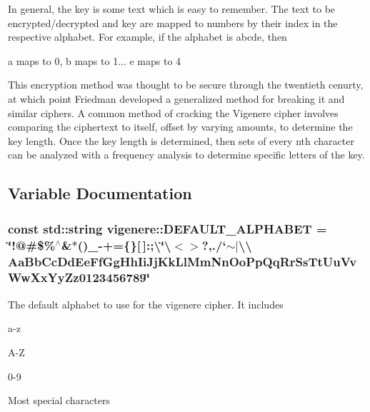 In general, the key is some text which is easy to remember. The text to be encrypted/decrypted and key are mapped to numbers by their index in the respective alphabet. For example, if the alphabet is \textquotesingle{}abcde\textquotesingle{}, then
\begin{DoxyItemize}
\item \textquotesingle{}a\textquotesingle{} maps to 0, \textquotesingle{}b\textquotesingle{} maps to 1... \textquotesingle{}e\textquotesingle{} maps to 4
\end{DoxyItemize}

This encryption method was thought to be secure through the twentieth cenurty, at which point Friedman developed a generalized method for breaking it and similar ciphers. A common method of cracking the Vigenere cipher involves comparing the ciphertext to itself, offset by varying amounts, to determine the key length. Once the key length is determined, then sets of every nth character can be analyzed with a frequency analysis to determine specific letters of the key. 

\subsection{Variable Documentation}
\subsubsection[{\texorpdfstring{D\+E\+F\+A\+U\+L\+T\+\_\+\+A\+L\+P\+H\+A\+B\+ET}{DEFAULT_ALPHABET}}]{\setlength{\rightskip}{0pt plus 5cm}const std\+::string vigenere\+::\+D\+E\+F\+A\+U\+L\+T\+\_\+\+A\+L\+P\+H\+A\+B\+ET = \char`\"{}!@\#\$\%$^\wedge$\&$\ast$()\+\_\+-\/+=\{\}\mbox{[}$\,$\mbox{]}\+:;\textbackslash{}\char`\"{}\textbackslash{}\textquotesingle{}$<$$>$?,./`$\sim$$\vert$\textbackslash{}\textbackslash{} Aa\+Bb\+Cc\+Dd\+Ee\+Ff\+Gg\+Hh\+Ii\+Jj\+Kk\+Ll\+Mm\+Nn\+Oo\+Pp\+Qq\+Rr\+Ss\+Tt\+Uu\+Vv\+Ww\+Xx\+Yy\+Zz0123456789\char`\"{}}\hypertarget{namespacevigenere_a7bb30f050b9b52887eb2463b36c4e7b6}{}\label{namespacevigenere_a7bb30f050b9b52887eb2463b36c4e7b6}
The default alphabet to use for the vigenere cipher. It includes
\begin{DoxyItemize}
\item a-\/z
\item A-\/Z
\item 0-\/9
\item Most special characters 
\end{DoxyItemize}